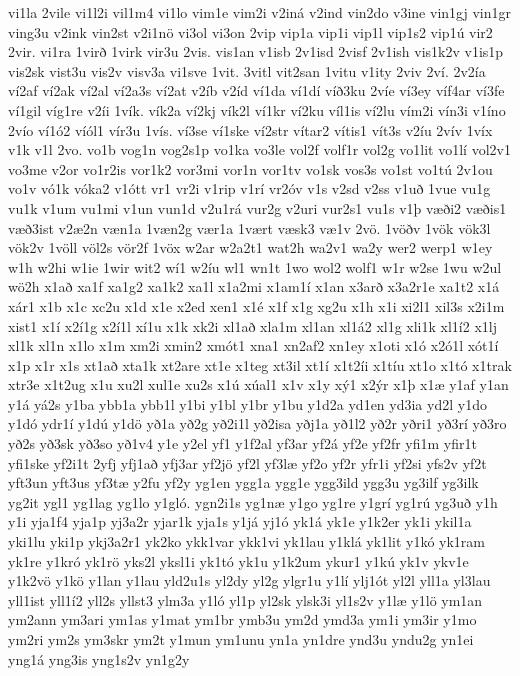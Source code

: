 {vi1la
2vile
vi1l2i
vil1m4
vi1lo
vim1e
vim2i
v2iná
v2ind
vin2do
v3ine
vin1gj
vin1gr
ving3u
v2ink
vin2st
v2i1nö
vi3ol
vi3on
2vip
vip1a
vip1i
vip1l
vip1s2
vip1ú
vir2
2vir.
vi1ra
1virð
1virk
vir3u
2vis.
vis1an
v1isb
2v1isd
2visf
2v1ish
vis1k2v
v1is1p
vis2sk
vist3u
vis2v
visv3a
vi1sve
1vit.
3vitl
vit2san
1vitu
v1ity
2viv
2ví.
2v2ía
ví2af
ví2ak
ví2al
ví2a3s
ví2at
v2íb
v2íd
ví1da
ví1dí
víð3ku
2víe
ví3ey
víf4ar
ví3fe
ví1gil
víg1re
v2íi
1vík.
vík2a
ví2kj
vík2l
ví1kr
ví2ku
víl1is
ví2lu
vím2i
vín3i
v1íno
2vío
ví1ó2
víól1
vír3u
1vís.
ví3se
ví1ske
ví2str
vítar2
vítis1
vít3s
v2íu
2vív
1víx
v1k
v1l
2vo.
vo1b
vog1n
vog2s1p
vo1ka
vo3le
vol2f
volf1r
vol2g
vo1lit
vo1lí
vol2v1
vo3me
v2or
vo1r2is
vor1k2
vor3mi
vor1n
vor1tv
vo1sk
vos3s
vo1st
vo1tú
2v1ou
vo1v
vó1k
vóka2
v1ótt
vr1
vr2i
v1rip
v1rí
vr2óv
v1s
v2sd
v2ss
v1uð
1vue
vu1g
vu1k
v1um
vu1mi
v1un
vun1d
v2u1rá
vur2g
v2uri
vur2s1
vu1s
v1þ
væði2
væðis1
væð3ist
v2æ2n
væn1a
1væn2g
vær1a
1vært
væsk3
væ1v
2vö.
1vöðv
1vök
vök3l
vök2v
1völl
völ2s
vör2f
1vöx
w2ar
w2a2t1
wat2h
wa2v1
wa2y
wer2
werp1
w1ey
w1h
w2hi
w1ie
1wir
wit2
wí1
w2íu
wl1
wn1t
1wo
wol2
wolf1
w1r
w2se
1wu
w2ul
wö2h
x1að
xa1f
xa1g2
xa1k2
xa1l
x1a2mi
x1am1í
x1an
x3arð
x3a2r1e
xa1t2
x1á
xár1
x1b
x1c
xc2u
x1d
x1e
x2ed
xen1
x1é
x1f
x1g
xg2u
x1h
x1i
xi2l1
xil3s
x2i1m
xist1
x1í
x2í1g
x2í1l
xí1u
x1k
xk2i
xl1að
xla1m
xl1an
xl1á2
xl1g
xli1k
xl1í2
x1lj
xl1k
xl1n
x1lo
x1m
xm2i
xmin2
xmót1
xna1
xn2af2
xn1ey
x1oti
x1ó
x2ó1l
xót1í
x1p
x1r
x1s
xt1að
xta1k
xt2are
xt1e
x1teg
xt3il
xt1í
x1t2íi
x1tíu
xt1o
x1tó
x1trak
xtr3e
x1t2ug
x1u
xu2l
xul1e
xu2s
x1ú
xúal1
x1v
x1y
xý1
x2ýr
x1þ
x1æ
y1af
y1an
y1á
yá2s
y1ba
ybb1a
ybb1l
y1bi
y1bl
y1br
y1bu
y1d2a
yd1en
yd3ia
yd2l
y1do
y1dó
ydr1í
y1dú
y1dö
yð1a
yð2g
yð2i1l
yð2isa
yðj1a
yð1l2
yð2r
yðri1
yð3rí
yð3ro
yð2s
yð3sk
yð3so
yð1v4
y1e
y2el
yf1
y1f2al
yf3ar
yf2á
yf2e
yf2fr
yfi1m
yfir1t
yfi1ske
yf2i1t
2yfj
yfj1að
yfj3ar
yf2jö
yf2l
yf3læ
yf2o
yf2r
yfr1i
yf2si
yfs2v
yf2t
yft3un
yft3us
yf3tæ
y2fu
yf2y
yg1en
ygg1a
ygg1e
ygg3ild
ygg3u
yg3ilf
yg3ilk
yg2it
ygl1
yg1lag
yg1lo
y1gló.
ygn2i1s
yg1næ
y1go
yg1re
y1grí
yg1rú
yg3uð
y1h
y1i
yja1f4
yja1p
yj3a2r
yjar1k
yja1s
y1já
yj1ó
yk1á
yk1e
y1k2er
yk1i
ykil1a
yki1lu
yki1p
ykj3a2r1
yk2ko
ykk1var
ykk1vi
yk1lau
y1klá
yk1lit
y1kó
yk1ram
yk1re
y1kró
yk1rö
yks2l
yksl1i
yk1tó
yk1u
y1k2um
ykur1
y1kú
yk1v
ykv1e
y1k2vö
y1kö
y1lan
y1lau
yld2u1s
yl2dy
yl2g
ylgr1u
y1lí
ylj1ót
yl2l
yll1a
yl3lau
yll1ist
yll1í2
yll2s
yllst3
ylm3a
y1ló
yl1p
yl2sk
ylsk3i
yl1s2v
y1læ
y1lö
ym1an
ym2ann
ym3ari
ym1as
y1mat
ym1br
ymb3u
ym2d
ymd3a
ym1i
ym3ir
y1mo
ym2ri
ym2s
ym3skr
ym2t
y1mun
ym1unu
yn1a
yn1dre
ynd3u
yndu2g
yn1ei
yng1á
yng3is
yng1s2v
yn1g2y
}
